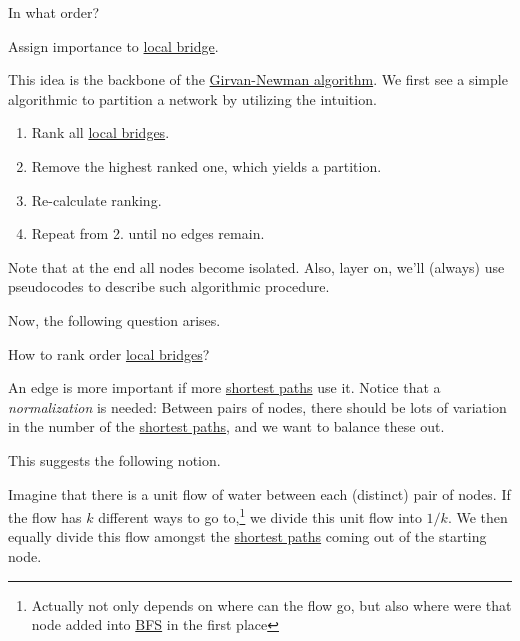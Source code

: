 \begin{problem}
In what order?
\end{problem}
\begin{answer}
	Assign importance to \hyperref[def:local-bridge]{local bridge}.
\end{answer}

This idea is the backbone of the \hyperref[algo:Girvan-Newman-algorithm]{Girvan-Newman algorithm}. We first see a simple algorithmic to partition a network by utilizing the intuition.
\begin{enumerate}
	\item Rank all \hyperref[def:local-bridge]{local bridges}.
	\item Remove the highest ranked one, which yields a partition.
	\item Re-calculate ranking.
	\item Repeat from 2. until no edges remain.
\end{enumerate}

\begin{remark}
	Note that at the end all nodes become isolated. Also, layer on, we'll (always) use pseudocodes to describe such algorithmic procedure.
\end{remark}

Now, the following question arises.
\begin{problem}
How to rank order \hyperref[def:local-bridge]{local bridges}?
\end{problem}

\begin{intuition}
	An edge is more important if more \hyperref[def:shortest-path]{shortest paths} use it. Notice that a \emph{normalization} is needed: Between pairs of nodes, there should be lots of variation in the number of the \hyperref[def:shortest-path]{shortest paths}, and we want to balance these out.
\end{intuition}

This suggests the following notion.
\begin{definition}[Betweenness]\label{def:betweenness}
	Imagine that there is a unit flow of water between each (distinct) pair of nodes. If the flow has \(k\) different ways to go to,\footnote{Actually not only depends on where can the flow go, but also where were that node added into \hyperref[algo:BFS]{BFS} in the first place} we divide this unit flow into \(1/k\). We then equally divide this flow amongst the \hyperref[def:shortest-path]{shortest paths} coming out of the starting node.
\end{definition}

